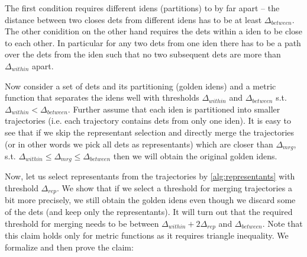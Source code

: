 The first condition requires different \glspl{iden} (partitions) to by far apart -- the distance between two closes \glspl{det} from different \glspl{iden} has to be at least $\Delta_{between}$. The other conidition on the other hand requires the \glspl{det} within a \gls{iden} to be close to each other. In particular for any two \glspl{det} from one \gls{iden} there has to be a path over the \glspl{det} from the \gls{iden} such that no two subsequent \glspl{det} are more than $\Delta_{within}$ apart.

Now consider a set of \glspl{det} and its partitioning (golden \glspl{iden}) and a metric function that separates the \glspl{iden} well with thresholds $\Delta_{within}$ and $\Delta_{between}$ s.t. $\Delta_{within} < \Delta_{between}$. Further assume that each \gls{iden} is partitioned into smaller trajectories (i.e. each trajectory contains \glspl{det} from only one \gls{iden}). It is easy to see that if we skip the representant selection and directly merge the trajectories (or in other words we pick all \glspl{det} as representants) which are closer than $\Delta_{mrg}$, s.t. $\Delta_{within} \leq \Delta_{mrg} \leq \Delta_{between}$ then we will obtain the original golden \glspl{iden}.

Now, let us select representants from the trajectories by \autoref{alg:representants} with threshold $\Delta_{rep}$. We show that if we select a threshold for merging trajectories a bit more precisely, we still obtain the golden \glspl{iden} even though we discard some of the \glspl{det} (and keep only the representants). It will turn out that the required threshold for merging needs to be between $\Delta_{within} + 2\Delta_{rep}$ and $\Delta_{between}$. Note that this claim holds only for metric functions as it requires triangle inequality. We formalize and then prove the claim:



